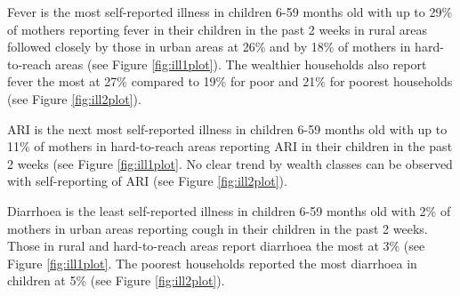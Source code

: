 \documentclass[12pt,a4paper]{article}
\begin{document}
Fever is the most self-reported illness in children 6-59 months old with up to 29\% of mothers reporting fever in their children in the past 2 weeks in rural areas followed closely by those in urban areas at 26\% and by 18\% of mothers in hard-to-reach areas (see Figure \ref{fig:ill1plot}). The wealthier households also report fever the most at 27\% compared to 19\% for poor and 21\% for poorest households (see Figure \ref{fig:ill2plot}).

ARI is the next most self-reported illness in children 6-59 months old with up to 11\% of mothers in hard-to-reach areas reporting ARI in their children in the past 2 weeks (see Figure \ref{fig:ill1plot}. No clear trend by wealth classes can be observed with self-reporting of ARI (see Figure \ref{fig:ill2plot}).

Diarrhoea is the least self-reported illness in children 6-59 months old with 2\% of mothers in urban areas reporting cough in their children in the past 2 weeks. Those in rural and hard-to-reach areas report diarrhoea the most at 3\% (see Figure \ref{fig:ill1plot}. The poorest households reported the most diarrhoea in children at 5\% (see Figure \ref{fig:ill2plot}).
\end{document}
